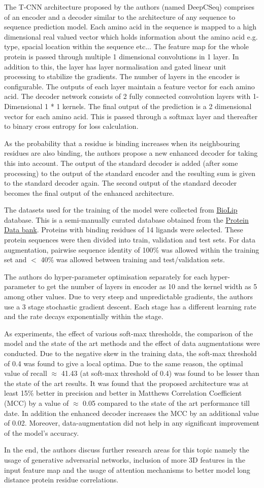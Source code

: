 \documentclass[10pt]{article}
\begin{document}
The T-CNN architecture proposed by the authors (named DeepCSeq) comprises of an encoder and a decoder similar to the architecture of any sequence to sequence prediction model. 
Each amino acid in the sequence is mapped to a high dimensional real valued vector 
which holds information about the amino acid e.g. type, spacial location within the sequence etc...
The feature map for the whole protein is passed through multiple 1 dimensional convolutions in 1 layer. 
In addition to this, the layer has layer normalisation and gated linear unit
processing to stabilize the gradients.
The number of layers in the encoder is configurable. The outputs of each layer maintain
a feature vector for each amino acid.
The decoder network consists of 2 fully connected convolution layers with 1-Dimensional
1 * 1 kernels. The final output of the prediction is a 2 dimensional vector for each
amino acid. This is passed through a softmax layer and thereafter to binary cross entropy
for loss calculation.

As the probability that a residue is binding increases when its neighbouring residues are also
binding, the authors propose a new enhanced decoder for taking this into account.
The output of the standard decoder is added (after some processing) to the output of the 
standard encoder and the resulting sum is given to the standard decoder again.
The second output of the standard decoder becomes the final output of the enhanced
architecture.

The datasets used for the training of the model were collected from \href{https://zhanglab.ccmb.med.umich.edu/BioLiP/}{BioLip} database.
This is a semi-manually curated database obtained from the \href{https://www.rcsb.org/}{Protein Data bank}.
Proteins with binding residues of 14 ligands were selected.
These protein sequences were then divided into train, validation and test sets.
For data augmentation, pairwise sequence identity of 100\% was allowed within the training set and $<$ 40\% was allowed between training and test/validation sets.

The authors do hyper-parameter optimisation separately for each hyper-parameter to get the number of layers in encoder as 10 and the kernel width as 5 among other values.
Due to very steep and unpredictable gradients, the authors use a 3 stage stochastic 
gradient descent. Each stage has a different learning rate and the rate decays exponentially within the stage.

As experiments, the effect of various soft-max thresholds, the comparison of the model and the state of the art methods and the effect of data augmentations were conducted.
Due to the negative skew in the training data, the soft-max threshold of 0.4 was found to give
a local optima.  Due to the same reason, the optimal value of recall $\approx$ 41.43 (at soft-max threshold of 0.4) was found to be lesser than the state of the art results.
It was found that the proposed architecture was at least 15\% better in precision and better in Matthews Correlation Coefficient (MCC) by a value of $\approx$ 0.05 compared to the state of the art performance till date.
In addition the enhanced decoder increases the MCC by an additional value of 0.02.
Moreover,   data-augmentation did not help in any significant improvement of the model's accuracy.

In the end, the authors discuss further research areas for this topic namely the usage of generative adversarial networks, inclusion of more 3D features in the input feature map and the usage of attention mechanisms to better model long distance protein residue correlations.
\end{document}
